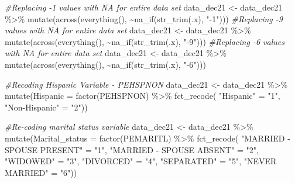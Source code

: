 \documentclass[
]{article}
\newenvironment{Shaded}{\begin{snugshade}}{\end{snugshade}}
\newcommand{\AttributeTok}[1]{\textcolor[rgb]{0.77,0.63,0.00}{#1}}
\newcommand{\CommentTok}[1]{\textcolor[rgb]{0.56,0.35,0.01}{\textit{#1}}}
\newcommand{\FunctionTok}[1]{\textcolor[rgb]{0.00,0.00,0.00}{#1}}
\newcommand{\NormalTok}[1]{#1}
\newcommand{\OtherTok}[1]{\textcolor[rgb]{0.56,0.35,0.01}{#1}}
\newcommand{\SpecialCharTok}[1]{\textcolor[rgb]{0.00,0.00,0.00}{#1}}
\newcommand{\StringTok}[1]{\textcolor[rgb]{0.31,0.60,0.02}{#1}}
\begin{document}
\begin{Shaded}
\begin{Highlighting}[]
\CommentTok{\#Replacing {-}1 values with NA for entire data set}
\NormalTok{data\_dec21 }\OtherTok{\textless{}{-}}\NormalTok{ data\_dec21 }\SpecialCharTok{\%\textgreater{}\%}
                  \FunctionTok{mutate}\NormalTok{(}\FunctionTok{across}\NormalTok{(}\FunctionTok{everything}\NormalTok{(), }\SpecialCharTok{\textasciitilde{}}\FunctionTok{na\_if}\NormalTok{(}\FunctionTok{str\_trim}\NormalTok{(.x), }\StringTok{"{-}1"}\NormalTok{)))}
\CommentTok{\#Replacing {-}9 values with NA for entire data set}
\NormalTok{data\_dec21 }\OtherTok{\textless{}{-}}\NormalTok{ data\_dec21 }\SpecialCharTok{\%\textgreater{}\%}
                  \FunctionTok{mutate}\NormalTok{(}\FunctionTok{across}\NormalTok{(}\FunctionTok{everything}\NormalTok{(), }\SpecialCharTok{\textasciitilde{}}\FunctionTok{na\_if}\NormalTok{(}\FunctionTok{str\_trim}\NormalTok{(.x), }\StringTok{"{-}9"}\NormalTok{)))}
\CommentTok{\#Replacing {-}6 values with NA for entire data set}
\NormalTok{data\_dec21 }\OtherTok{\textless{}{-}}\NormalTok{ data\_dec21 }\SpecialCharTok{\%\textgreater{}\%}
                  \FunctionTok{mutate}\NormalTok{(}\FunctionTok{across}\NormalTok{(}\FunctionTok{everything}\NormalTok{(), }\SpecialCharTok{\textasciitilde{}}\FunctionTok{na\_if}\NormalTok{(}\FunctionTok{str\_trim}\NormalTok{(.x), }\StringTok{"{-}6"}\NormalTok{)))}

\CommentTok{\#Recoding Hispanic Variable {-} PEHSPNON}
\NormalTok{data\_dec21 }\OtherTok{\textless{}{-}}\NormalTok{ data\_dec21 }\SpecialCharTok{\%\textgreater{}\%} 
  \FunctionTok{mutate}\NormalTok{(}\AttributeTok{Hispanic =} \FunctionTok{factor}\NormalTok{(PEHSPNON) }\SpecialCharTok{\%\textgreater{}\%} 
    \FunctionTok{fct\_recode}\NormalTok{(}
      \StringTok{"Hispanic"} \OtherTok{=} \StringTok{"1"}\NormalTok{,}
      \StringTok{"Non{-}Hispanic"} \OtherTok{=} \StringTok{"2"}\NormalTok{))}



\CommentTok{\#Re{-}coding marital status variable}
\NormalTok{data\_dec21 }\OtherTok{\textless{}{-}}\NormalTok{ data\_dec21 }\SpecialCharTok{\%\textgreater{}\%} 
  \FunctionTok{mutate}\NormalTok{(}\AttributeTok{Marital\_status =} \FunctionTok{factor}\NormalTok{(PEMARITL) }\SpecialCharTok{\%\textgreater{}\%} 
    \FunctionTok{fct\_recode}\NormalTok{(}
      \StringTok{"MARRIED {-} SPOUSE PRESENT"} \OtherTok{=} \StringTok{"1"}\NormalTok{,}
      \StringTok{"MARRIED {-} SPOUSE ABSENT"} \OtherTok{=} \StringTok{"2"}\NormalTok{,}
      \StringTok{"WIDOWED"} \OtherTok{=} \StringTok{"3"}\NormalTok{,}
      \StringTok{"DIVORCED"} \OtherTok{=} \StringTok{"4"}\NormalTok{,}
      \StringTok{"SEPARATED"} \OtherTok{=} \StringTok{"5"}\NormalTok{,}
      \StringTok{"NEVER MARRIED"} \OtherTok{=} \StringTok{"6"}\NormalTok{))}


\end{Highlighting}
\end{Shaded}
\end{document}
